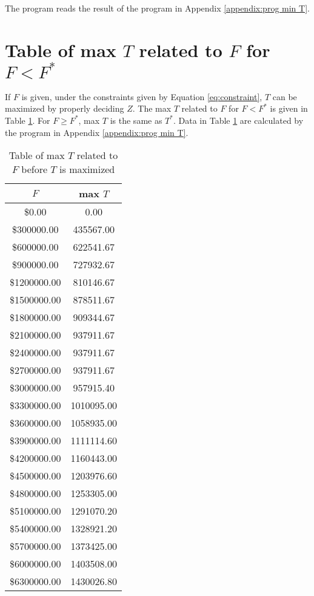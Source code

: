 \documentclass{article}
\begin{document}
\inputminted{python}{../plot.py}

The program reads the result of the program in Appendix \ref{appendix:prog min T}.

\section{Table of max $T$ related to $F$ for $F<F^*$}

If $F$ is given, under the constraints given by Equation \ref{eq:constraint}, $T$ can be maximized by properly deciding $Z$.
The max $T$ related to $F$ for $F<F^*$ is given in Table \ref{tab:max T funds}.
For $F\ge F^*$, max $T$ is the same as $T^*$.
Data in Table \ref{tab:max T funds} are calculated by the program in Appendix \ref{appendix:prog min T}.

\begin{table}[h!]
\centering
\caption{Table of max $T$ related to $F$ before $T$ is maximized}
\label{tab:max T funds}
\begin{tabular}{cc}
\toprule
$F$ & max $T$\\
\midrule
\$0.00 & 0.00\\
\$300000.00 & 435567.00\\
\$600000.00 & 622541.67\\
\$900000.00 & 727932.67\\
\$1200000.00 & 810146.67\\
\$1500000.00 & 878511.67\\
\$1800000.00 & 909344.67\\
\$2100000.00 & 937911.67\\
\$2400000.00 & 937911.67\\
\$2700000.00 & 937911.67\\
\$3000000.00 & 957915.40\\
\$3300000.00 & 1010095.00\\
\$3600000.00 & 1058935.00\\
\$3900000.00 & 1111114.60\\
\$4200000.00 & 1160443.00\\
\$4500000.00 & 1203976.60\\
\$4800000.00 & 1253305.00\\
\$5100000.00 & 1291070.20\\
\$5400000.00 & 1328921.20\\
\$5700000.00 & 1373425.00\\
\$6000000.00 & 1403508.00\\
\$6300000.00 & 1430026.80\\

\end{tabular}
\end{table}
\end{document}
